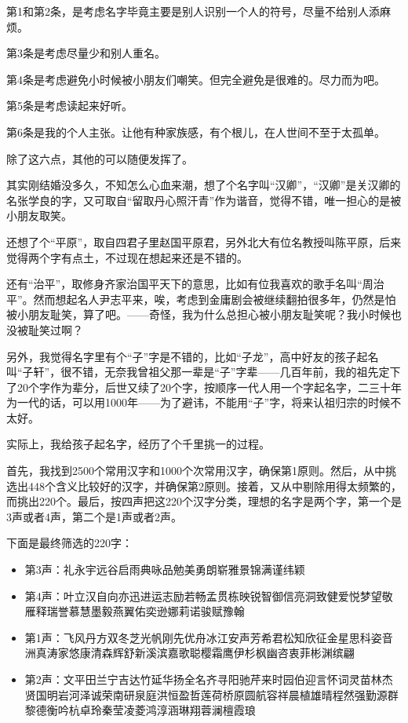 \documentclass[twoside,openright,headings=optiontohead]{ctexbook} %
\providecommand{\tightlist}{%
   \setlength{\itemsep}{0pt}\setlength{\parskip}{0pt}}
\begin{document}
{第1和第2条，是考虑名字毕竟主要是别人识别一个人的符号，尽量不给别人添麻烦。

第3条是考虑尽量少和别人重名。

第4条是考虑避免小时候被小朋友们嘲笑。但完全避免是很难的。尽力而为吧。

第5条是考虑读起来好听。

第6条是我的个人主张。让他有种家族感，有个根儿，在人世间不至于太孤单。

除了这六点，其他的可以随便发挥了。

其实刚结婚没多久，不知怎么心血来潮，想了个名字叫``汉卿''，``汉卿''是关汉卿的名张学良的字，又可取自``留取丹心照汗青''作为谐音，觉得不错，唯一担心的是被小朋友取笑。

还想了个``平原''，取自四君子里赵国平原君，另外北大有位名教授叫陈平原，后来觉得两个字有点土，不过现在想起来还是不错的。

还有``治平''，取修身齐家治国平天下的意思，比如有位我喜欢的歌手名叫``周治平''。然而想起名人尹志平来，唉，考虑到金庸剧会被继续翻拍很多年，仍然是怕被小朋友耻笑，算了吧。------奇怪，我为什么总担心被小朋友耻笑呢？我小时候也没被耻笑过啊？

另外，我觉得名字里有个``子''字是不错的，比如``子龙''，高中好友的孩子起名叫``子轩''，很不错，无奈我曾祖父那一辈是``子''字辈------几百年前，我的祖先定下了20个字作为辈分，后世又续了20个字，按顺序一代人用一个字起名字，二三十年为一代的话，可以用1000年------为了避讳，不能用``子''字，将来认祖归宗的时候不太好。

实际上，我给孩子起名字，经历了个千里挑一的过程。

首先，我找到2500个常用汉字和1000个次常用汉字，确保第1原则。然后，从中挑选出448个含义比较好的汉字，并确保第2原则。接着，又从中剔除用得太频繁的，而挑出220个。最后，按四声把这220个汉字分类，理想的名字是两个字，第一个是3声或者4声，第二个是1声或者2声。

下面是最终筛选的220字：

\begin{itemize}
\tightlist
\item
  第3声：礼永宇远谷启雨典咏品勉美勇朗崭雅景锦满谨纬颖
\item
  第4声：叶立汉自向亦迅进运志励若畅孟贯栋映锐智御信亮洞致健爱悦梦望敬雁释瑞誉慕慧墨毅燕翼佑奕逊娜莉诺骏赋豫翰
\item
  第1声：飞风丹方双冬芝光帆刚先优舟冰江安声芳希君松知欣征金星思科姿音洲真涛家悠康清森辉舒新溪滨嘉歌聪樱霜鹰伊杉枫幽咨衷菲彬渊缤翩
\item
  第2声：文平田兰宁吉达竹延华扬全名齐寻阳驰芹来时园伯迎言怀词灵苗林杰贤国明岩河泽诚荣南研泉庭洪恒盈哲莲荷桥原圆航容祥晨植雄晴程然强勤源群黎德衡吟杭卓玲秦莹凌菱鸿淳涵琳翔蓉澜檀霞琅
\end{itemize}

}
\end{document}
